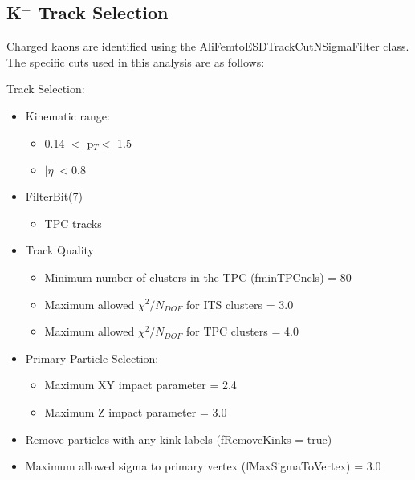 \documentclass[../AnalysisNoteJBuxton.tex]{subfiles}
\begin{document}
\subsection{\texorpdfstring{K$^{\pm}$}{TEXT} Track Selection}
\label{KchTrackSelection}

Charged kaons are identified using the AliFemtoESDTrackCutNSigmaFilter class.  The specific cuts used in this analysis are as follows:

 Track Selection:
 \begin{itemize}
  \itemsep0em
  \item Kinematic range:
  \begin{itemize}
   \itemsep0em
   \item 0.14 $<$ p$_{T} <$ 1.5
   \item $|\eta| < 0.8$
  \end{itemize}
  \item FilterBit(7)
  \begin{itemize}
   \item TPC tracks
  \end{itemize}
  \item Track Quality
  \begin{itemize}
   \item Minimum number of clusters in the TPC (fminTPCncls) = 80
   \item Maximum allowed $\chi^{2}/N_{DOF}$ for ITS clusters = 3.0
   \item Maximum allowed $\chi^{2}/N_{DOF}$ for TPC clusters = 4.0 
  \end{itemize}
  \item Primary Particle Selection:
  \begin{itemize} 
   \item Maximum XY impact parameter = 2.4
   \item Maximum Z impact parameter = 3.0
  \end{itemize} 
  \item Remove particles with any kink labels (fRemoveKinks = true)
  \item Maximum allowed sigma to primary vertex (fMaxSigmaToVertex) = 3.0
 \end{itemize} 
 
\end{document}
